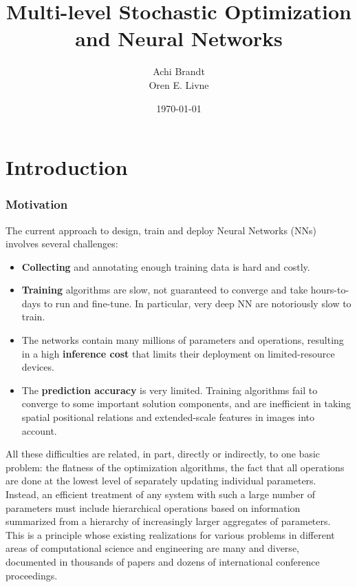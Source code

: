 \documentclass{article} %
\title{Multi-level Stochastic Optimization and Neural Networks}
\author{
Achi Brandt\\
Oren E. Livne \\
}
\date{\today}
\begin{document}
\maketitle
\tableofcontents
\todototoc
\listoftodos



\newpage
\part{Introduction}

\section{Motivation}
The current approach to design, train and deploy Neural Networks (NNs) involves several challenges:

\begin{itemize}
  \item \textbf{Collecting} and annotating enough training data is hard and costly.
  \item \textbf{Training} algorithms are slow, not guaranteed to converge and take hours-to-days to run and fine-tune. In particular, very deep NN are notoriously slow to train.
  \item The networks contain many millions of parameters and operations, resulting in a high \textbf{inference cost} that limits their deployment on limited-resource devices.
  \item The \textbf{prediction accuracy} is very limited. Training algorithms fail to converge to some important solution components, and are inefficient in taking spatial positional relations and extended-scale features in images into account.
 \end{itemize}
 
All these difficulties are related, in part, directly or indirectly, to one basic problem: the flatness of the optimization algorithms, the fact that all operations are done at the lowest level of separately updating individual parameters. Instead, an efficient treatment of any system with such a large number of parameters must include hierarchical operations based on information summarized from a hierarchy of increasingly larger aggregates of parameters. This is a principle whose existing realizations for various problems in different areas of computational science and engineering are many and diverse, documented in thousands of papers and dozens of international conference proceedings. 
\end{document}

